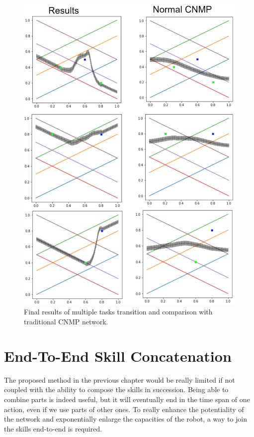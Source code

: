 \begin{figure}
    \centering
    \includegraphics[width=0.9\linewidth]{figures/tp-multiple-shift-results.png}
    \caption{ Final results of multiple tasks transition and comparison with traditional CNMP network. }
    \label{fig:tp-multiple-shift-results}
\end{figure}


\newpage
\section{End-To-End Skill Concatenation}
The proposed method in the previous chapter would be really limited if not coupled with the ability to compose the skills in succession. Being able to combine parts is indeed useful, but it will eventually end in the time span of one action, even if we use parts of other ones. To really enhance the potentiality of the network and exponentially enlarge the capacities of the robot, a way to join the skills end-to-end is required. 

